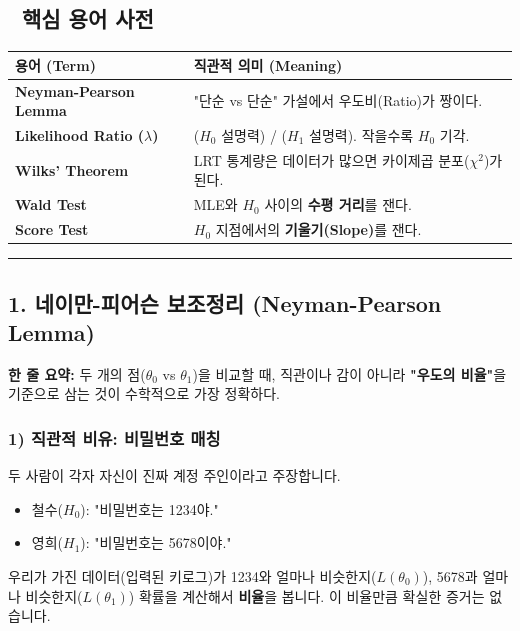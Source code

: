 \documentclass[11pt,a4paper]{book}
\theoremstyle{definition}
\begin{document}
\subsection*{📝 핵심 용어 사전}
\begin{table}[h]
\centering
\begin{tabularx}{\textwidth}{|p{}|X|}
\hline
\textbf{용어 (Term)} & \textbf{직관적 의미 (Meaning)} \\
\hline
\textbf{Neyman-Pearson Lemma} & "단순 vs 단순" 가설에서 우도비(Ratio)가 짱이다. \\
\hline
\textbf{Likelihood Ratio ($\lambda$)} & ($H_0$ 설명력) / ($H_1$ 설명력). 작을수록 $H_0$ 기각. \\
\hline
\textbf{Wilks' Theorem} & LRT 통계량은 데이터가 많으면 카이제곱 분포($\chi^2$)가 된다. \\
\hline
\textbf{Wald Test} & MLE와 $H_0$ 사이의 \textbf{수평 거리}를 잰다. \\
\hline
\textbf{Score Test} & $H_0$ 지점에서의 \textbf{기울기(Slope)}를 잰다. \\
\hline
\end{tabularx}
\end{table}

\vspace{0.5cm}\hrule\vspace{0.5cm}

\subsection{1. 네이만-피어슨 보조정리 (Neyman-Pearson Lemma)}

\begin{conceptbox}[title={개념 1: 가장 강력한 검정(UMP)을 만드는 레시피}]
\textbf{한 줄 요약:} 두 개의 점($\theta_0$ vs $\theta_1$)을 비교할 때, 직관이나 감이 아니라 \textbf{"우도의 비율"}을 기준으로 삼는 것이 수학적으로 가장 정확하다.
\end{conceptbox}

\subsubsection*{1) 직관적 비유: 비밀번호 매칭}
두 사람이 각자 자신이 진짜 계정 주인이라고 주장합니다.
\begin{itemize}
    \item 철수($H_0$): "비밀번호는 1234야."
    \item 영희($H_1$): "비밀번호는 5678이야."
\end{itemize}
우리가 가진 데이터(입력된 키로그)가 1234와 얼마나 비슷한지($L(\theta_0)$), 5678과 얼마나 비슷한지($L(\theta_1)$) 확률을 계산해서 \textbf{비율}을 봅니다. 이 비율만큼 확실한 증거는 없습니다.
\end{document}
